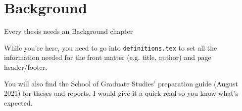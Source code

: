 \chapter{Background}

Every thesis needs an Background chapter

While you're here, you need to go into \texttt{definitions.tex} to set all the 
information needed for the front matter (e.g. title, author) and page 
header/footer.

You will also find the School of Graduate Studies' preparation guide (August 
2021) for theses and reports. I would give it a quick read so you know what's 
expected.